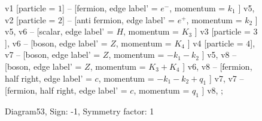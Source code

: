 \documentclass{revtex4}
\begin{document}
\begin{figure}[!htb]
\begin{center}
{v1 [particle = \(1\)] -- [fermion, edge label' = \(e^{-}\), momentum = \(k_{1}\) ] v5, 
v2 [particle = \(2\)] -- [anti fermion, edge label' = \(e^{+}\), momentum = \(k_{2}\) ] v5, 
v6 -- [scalar, edge label' = \(H\), momentum = \(K_{3}\) ] v3 [particle = \(3\)], 
v6 -- [boson, edge label' = \(Z\), momentum = \(K_{4}\) ] v4 [particle = \(4\)], 
v7 -- [boson, edge label' = \(Z\), momentum = \(-k_{1} - k_{2}\) ] v5, 
v8 -- [boson, edge label' = \(Z\), momentum = \(K_{3} + K_{4}\) ] v6, 
v8 -- [fermion, half right, edge label' = \(c\), momentum = \(-k_{1} - k_{2} + q_{1}\) ] v7, 
v7 -- [fermion, half right, edge label' = \(c\), momentum = \(q_{1}\) ] v8, 
};
\end{center}
\caption{Diagram53, Sign: -1, Symmetry factor: 1}
\end{figure}
\newpage
\end{document}
